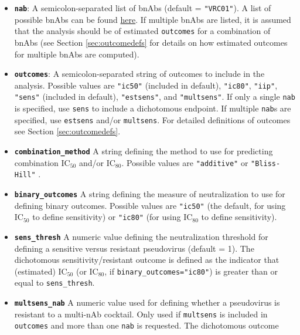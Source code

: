 \documentclass[]{article}
\providecommand{\tightlist}{%
  \setlength{\itemsep}{0pt}\setlength{\parskip}{0pt}}
\begin{document}
\begin{itemize}
\tightlist
\item
  \textbf{\texttt{nab}}: A semicolon-separated list of bnAbs (default =
  \texttt{"VRC01"}). A list of possible bnAbs can be found
  \href{https://www.hiv.lanl.gov/components/sequence/HIV/neutralization/main.comp}{here}.
  If multiple bnAbs are listed, it is assumed that the analysis should
  be of estimated \texttt{outcomes} for a combination of bnAbs (see
  Section \ref{sec:outcomedefs} for details on how estimated outcomes
  for multiple bnAbs are computed).
\item
  \textbf{\texttt{outcomes}}: A semicolon-separated string of outcomes
  to include in the analysis. Possible values are \texttt{"ic50"}
  (included in default), \texttt{"ic80"}, \texttt{"iip"},
  \texttt{"sens"} (included in default), \texttt{"estsens"}, and
  \texttt{"multsens"}. If only a single \texttt{nab} is specified, use
  \texttt{sens} to include a dichotomous endpoint. If multiple
  \texttt{nab}s are specified, use \texttt{estsens} and/or
  \texttt{multsens}. For detailed definitions of outcomes see Section
  \ref{sec:outcomedefs}.
\item
  \textbf{\texttt{combination\_method}} A string defining the method to
  use for predicting combination IC\(_{50}\) and/or IC\(_{80}\).
  Possible values are \texttt{"additive"} \citep[the default, for the
  additive model defined in][]{wagh2016optimal} or \texttt{"Bliss-Hill"}
  \citep[for the Bliss-Hill model defined in][]{wagh2016optimal}.
\item
  \textbf{\texttt{binary\_outcomes}} A string defining the measure of
  neutralization to use for defining binary outcomes. Possible values
  are \texttt{"ic50"} (the default, for using IC\(_{50}\) to define
  sensitivity) or \texttt{"ic80"} (for using IC\(_{80}\) to define
  sensitivity).
\item
  \textbf{\texttt{sens\_thresh}} A numeric value defining the
  neutralization threshold for defining a sensitive versus resistant
  pseudovirus (default = 1). The dichotomous sensitivity/resistant
  outcome is defined as the indicator that (estimated) IC\(_{50}\) (or
  IC\(_{80}\), if \texttt{binary\_outcomes="ic80"}) is greater than or
  equal to \texttt{sens\_thresh}.
\item
  \textbf{\texttt{multsens\_nab}} A numeric value used for defining
  whether a pseudovirus is resistant to a multi-nAb cocktail. Only used
  if \texttt{multsens} is included in \texttt{outcomes} and more than
  one \texttt{nab} is requested. The dichotomous outcome

\end{itemize}
\end{document}
